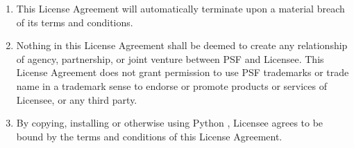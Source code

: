 \begin{enumerate}
\item
This License Agreement will automatically terminate upon a material
breach of its terms and conditions.

\item
Nothing in this License Agreement shall be deemed to create any
relationship of agency, partnership, or joint venture between PSF and
Licensee.  This License Agreement does not grant permission to use PSF
trademarks or trade name in a trademark sense to endorse or promote
products or services of Licensee, or any third party.

\item
By copying, installing or otherwise using Python \version, Licensee
agrees to be bound by the terms and conditions of this License
Agreement.
\end{enumerate}


\centerline{}

\centerline{}

